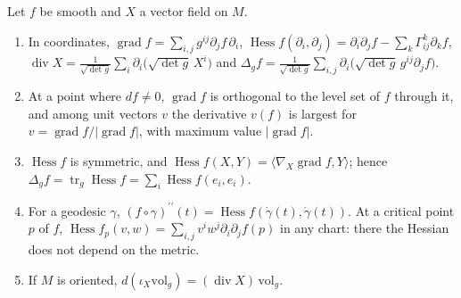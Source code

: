 \begin{proposition}\label{riemannian-geometry:proposition-gradient-hessian}
Let $f$ be smooth and $X$ a vector field on $M$.
\begin{enumerate}
\item In coordinates, $\operatorname{grad}f = \sum_{i,j}g^{ij}\partial_jf\,\partial_i$, $\operatorname{Hess}f(\partial_i, \partial_j) = \partial_i\partial_jf - \sum_k\Gamma^k_{ij}\partial_kf$,
$\operatorname{div}X = \frac{1}{\sqrt{\det g}}\sum_i\partial_i\bigl(\sqrt{\det g}\,X^i\bigr)$ and $\Delta_gf = \frac{1}{\sqrt{\det g}}\sum_{i,j}\partial_i\bigl(\sqrt{\det g}\,g^{ij}\partial_jf\bigr)$.
\item At a point where $df \neq 0$, $\operatorname{grad}f$ is orthogonal to the level set of $f$ through it, and among unit vectors $v$ the derivative $v(f)$ is largest for $v = \operatorname{grad}f/|\operatorname{grad}f|$,
with maximum value $|\operatorname{grad}f|$.
\item $\operatorname{Hess}f$ is symmetric, and $\operatorname{Hess}f(X, Y) = \langle\nabla_X\operatorname{grad}f, Y\rangle$; hence $\Delta_gf = \operatorname{tr}_g\operatorname{Hess}f = \sum_i\operatorname{Hess}f(e_i, e_i)$.
\item For a geodesic $\gamma$, $(f \circ \gamma)^{\prime\prime}(t) = \operatorname{Hess}f(\dot\gamma(t), \dot\gamma(t))$. At a critical point $p$ of $f$, $\operatorname{Hess}f_p(v, w) = \sum_{i,j}v^iw^j\partial_i\partial_jf(p)$ in any chart:
there the Hessian does not depend on the metric.
\item If $M$ is oriented, $d(\iota_X\mathrm{vol}_g) = (\operatorname{div}X)\,\mathrm{vol}_g$.
\end{enumerate}
\end{proposition}

